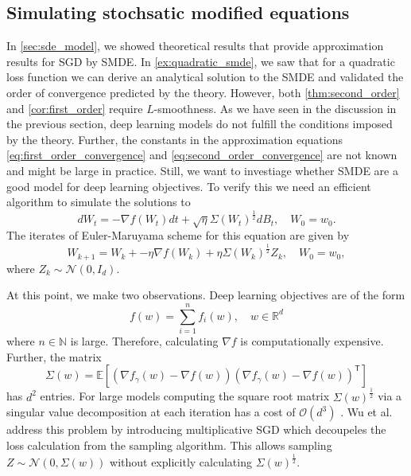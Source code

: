 \documentclass[12pt]{article}
\theoremstyle{definition}
\numberwithin{equation}{section}
\newcommand{\N}{\mathbb{N}}
\newcommand{\R}{\mathbb{R}}
\newcommand{\CN}{\mathcal{N}}
\newcommand{\CO}{\mathcal{O}}
\newcommand{\T}{\mathsf{T}}
\newcommand{\ev}[1]{\mathbb{E}\left[{#1}\right]}
\begin{document}
\subsection{Simulating stochsatic modified equations}
In \autoref{sec:sde_model}, we showed theoretical results that provide approximation results for SGD by SMDE. 
In \autoref{ex:quadratic_smde}, we saw that for a quadratic loss function we can derive an analytical solution to the SMDE and validated the order of convergence predicted by the theory.
However, both \autoref{thm:second_order} and \autoref{cor:first_order} require $L$-smoothness. As we have seen in the discussion in the previous section, deep learning models do not fulfill the conditions imposed by the theory. Further, the constants in the approximation equations \eqref{eq:first_order_convergence} and \eqref{eq:second_order_convergence} are not known and might be large in practice. 
Still, we want to investiage whether SMDE are a good model for deep learning objectives. To verify this we need an efficient algorithm to simulate the solutions to 
\begin{equation}
  d W_t = -\nabla f(W_t) dt + \sqrt{\eta}\Sigma(W_t)^{\frac{1}{2}}dB_t, \quad W_0 = w_0.
\end{equation}
The iterates of Euler-Maruyama scheme for this equation are given by 
\begin{equation}
  W_{k+1} = W_k + -\eta\nabla f(W_k) + \eta\Sigma(W_k)^{\frac{1}{2}} Z_k, \quad W_0 = w_0,
\end{equation}
where $Z_k \sim \CN(0, I_d)$.

At this point, we make two observations. Deep learning objectives are of the form
\begin{equation*}
  f(w) = \sum_{i=1}^n f_i(w), \quad w \in \R^d
\end{equation*}
where $n \in \N$ is large. Therefore, calculating $\nabla f$ is computationally expensive. Further, the matrix
\begin{equation*}
  \Sigma(w)= \ev{(\nabla f_{\gamma}(w) - \nabla f(w))(\nabla f_{\gamma}(w) - \nabla f(w))^\T}
\end{equation*}
has $d^2$ entries. For large models computing the square root matrix $\Sigma(w)^{\frac{1}{2}}$ via a singular value decomposition at each iteration has a cost of $\CO(d^3)$ \cite{golubMatrixComputations1996}.
Wu et al. \cite{wuNoisyGradientDescent2020a} address this problem by introducing multiplicative SGD which decoupeles the loss calculation from the sampling algorithm. This allows sampling $Z \sim \CN(0, \Sigma(w))$ without explicitly calculating $\Sigma(w)^{\frac{1}{2}}$.
\end{document}
